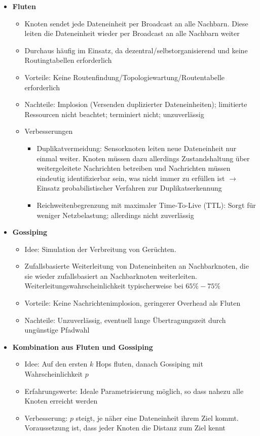 \begin{itemize}
	\item \textbf{Fluten}
	\begin{itemize}
		\item Knoten sendet jede Dateneinheit per Broadcast an alle Nachbarn. Diese leiten die Dateneinheit wieder per Broadcast an alle Nachbarn weiter
		\item Durchaus häufig im Einsatz, da dezentral/selbstorganisierend und keine Routingtabellen erforderlich
		\item Vorteile: Keine Routenfindung/Topologiewartung/Routentabelle erforderlich
		\item Nachteile: Implosion (Versenden duplizierter Dateneinheiten); limitierte Ressourcen nicht beachtet; terminiert nicht; unzuverlässig
		\item Verbesserungen
		\begin{itemize}
			\item Duplikatvermeidung: Sensorknoten leiten neue Dateneinheit nur einmal weiter. Knoten müssen dazu allerdings Zustandshaltung über weitergeleitete Nachrichten betreiben und Nachrichten müssen eindeutig identifizierbar sein, was nicht immer zu erfüllen ist \(\rightarrow\) Einsatz probabilistischer Verfahren zur Duplikatserkennung
			\item Reichweitenbegrenzung mit maximaler Time-To-Live (TTL): Sorgt für weniger Netzbelastung; allerdings nicht zuverlässig
		\end{itemize}
	\end{itemize}
	\item \textbf{Gossiping}
	\begin{itemize}
		\item Idee: Simulation der Verbreitung von Gerüchten. 
		\item Zufallsbasierte Weiterleitung von Dateneinheiten an Nachbarknoten, die sie wieder zufallsbasiert an Nachbarknoten weiterleiten. Weiterleitungswahrscheinlichkeit typischerweise bei \(65\%-75\%\)
		\item Vorteile: Keine Nachrichtenimplosion, geringerer Overhead als Fluten
		\item Nachteile: Unzuverlässig, eventuell lange Übertragungszeit durch ungünstige Pfadwahl
	\end{itemize}
	\item \textbf{Kombination aus Fluten und Gossiping}
	\begin{itemize}
		\item Idee: Auf den ersten \(k\) Hops fluten, danach Gossiping mit Wahrscheinlichkeit \(p\)
		\item Erfahrungswerte: Ideale Parametrisierung möglich, so dass nahezu alle Knoten erreicht werden
		\item Verbesserung: \(p\) steigt, je näher eine Dateneinheit ihrem Ziel kommt. Voraussetzung ist, dass jeder Knoten die Distanz zum Ziel kennt
	\end{itemize}
\end{itemize}

